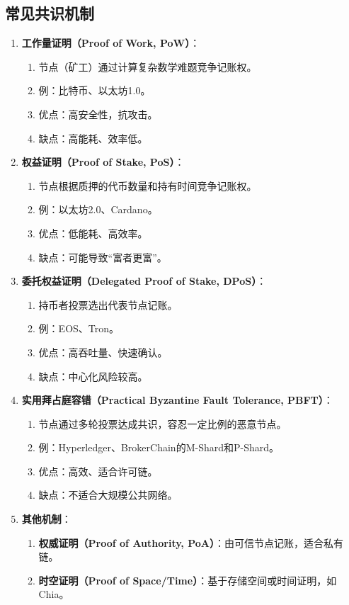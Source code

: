 \documentclass[12pt]{ctexart}
\begin{document}
\subsection{常见共识机制}
\begin{enumerate}
    \item \textbf{工作量证明（Proof of Work, PoW）}：
        \begin{enumerate}
            \item 节点（矿工）通过计算复杂数学难题竞争记账权。
            \item 例：比特币、以太坊1.0。
            \item 优点：高安全性，抗攻击。
            \item 缺点：高能耗、效率低。
        \end{enumerate}
    \item \textbf{权益证明（Proof of Stake, PoS）}：
        \begin{enumerate}
            \item 节点根据质押的代币数量和持有时间竞争记账权。
            \item 例：以太坊2.0、Cardano。
            \item 优点：低能耗、高效率。
            \item 缺点：可能导致“富者更富”。
        \end{enumerate}
    \item \textbf{委托权益证明（Delegated Proof of Stake, DPoS）}：
        \begin{enumerate}
            \item 持币者投票选出代表节点记账。
            \item 例：EOS、Tron。
            \item 优点：高吞吐量、快速确认。
            \item 缺点：中心化风险较高。
        \end{enumerate}
    \item \textbf{实用拜占庭容错（Practical Byzantine Fault Tolerance, PBFT）}：
        \begin{enumerate}
            \item 节点通过多轮投票达成共识，容忍一定比例的恶意节点。
            \item 例：Hyperledger、BrokerChain的M-Shard和P-Shard。
            \item 优点：高效、适合许可链。
            \item 缺点：不适合大规模公共网络。
        \end{enumerate}
    \item \textbf{其他机制}：
        \begin{enumerate}
            \item \textbf{权威证明（Proof of Authority, PoA）}：由可信节点记账，适合私有链。
            \item \textbf{时空证明（Proof of Space/Time）}：基于存储空间或时间证明，如 Chia。
        \end{enumerate}
\end{enumerate}
\end{document}
